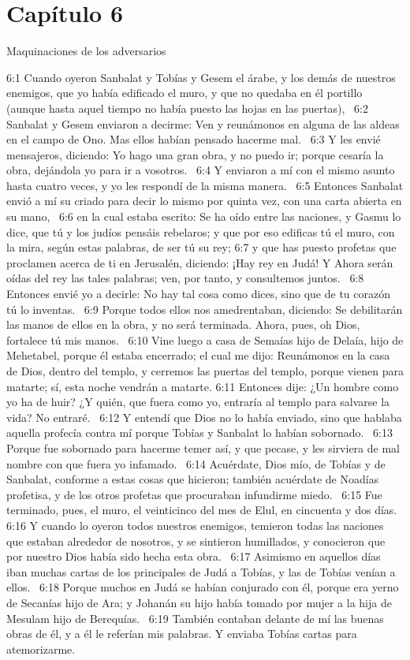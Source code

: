 \section*{Capítulo 6}
Maquinaciones de los adversarios  

6:1 Cuando oyeron Sanbalat y Tobías y Gesem el árabe, y los demás de nuestros enemigos, que yo había edificado el muro, y que no quedaba en él portillo (aunque hasta aquel tiempo no había puesto las hojas en las puertas),  
6:2 Sanbalat y Gesem enviaron a decirme: Ven y reunámonos en alguna de las aldeas en el campo de Ono. Mas ellos habían pensado hacerme mal.  
6:3 Y les envié mensajeros, diciendo: Yo hago una gran obra, y no puedo ir; porque cesaría la obra, dejándola yo para ir a vosotros.  
6:4 Y enviaron a mí con el mismo asunto hasta cuatro veces, y yo les respondí de la misma manera.  
6:5 Entonces Sanbalat envió a mí su criado para decir lo mismo por quinta vez, con una carta abierta en su mano,  
6:6 en la cual estaba escrito: Se ha oído entre las naciones, y Gasmu lo dice, que tú y los judíos pensáis rebelaros; y que por eso edificas tú el muro, con la mira, según estas palabras, de ser tú su rey; 
6:7 y que has puesto profetas que proclamen acerca de ti en Jerusalén, diciendo: ¡Hay rey en Judá! Y Ahora serán oídas del rey las tales palabras; ven, por tanto, y consultemos juntos.  
6:8 Entonces envié yo a decirle: No hay tal cosa como dices, sino que de tu corazón tú lo inventas.  
6:9 Porque todos ellos nos amedrentaban, diciendo: Se debilitarán las manos de ellos en la obra, y no será terminada. Ahora, pues, oh Dios, fortalece tú mis manos.  
6:10 Vine luego a casa de Semaías hijo de Delaía, hijo de Mehetabel, porque él estaba encerrado; el cual me dijo: Reunámonos en la casa de Dios, dentro del templo, y cerremos las puertas del templo, porque vienen para matarte; sí, esta noche vendrán a matarte. 
6:11 Entonces dije: ¿Un hombre como yo ha de huir? ¿Y quién, que fuera como yo, entraría al templo para salvarse la vida? No entraré.  
6:12 Y entendí que Dios no lo había enviado, sino que hablaba aquella profecía contra mí porque Tobías y Sanbalat lo habían sobornado.  
6:13 Porque fue sobornado para hacerme temer así, y que pecase, y les sirviera de mal nombre con que fuera yo infamado.  
6:14 Acuérdate, Dios mío, de Tobías y de Sanbalat, conforme a estas cosas que hicieron; también acuérdate de Noadías profetisa, y de los otros profetas que procuraban infundirme miedo.  
6:15 Fue terminado, pues, el muro, el veinticinco del mes de Elul, en cincuenta y dos días.  
6:16 Y cuando lo oyeron todos nuestros enemigos, temieron todas las naciones que estaban alrededor de nosotros, y se sintieron humillados, y conocieron que por nuestro Dios había sido hecha esta obra.  
6:17 Asimismo en aquellos días iban muchas cartas de los principales de Judá a Tobías, y las de Tobías venían a ellos.  
6:18 Porque muchos en Judá se habían conjurado con él, porque era yerno de Secanías hijo de Ara; y Johanán su hijo había tomado por mujer a la hija de Mesulam hijo de Berequías.  
6:19 También contaban delante de mí las buenas obras de él, y a él le referían mis palabras. Y enviaba Tobías cartas para atemorizarme.  
